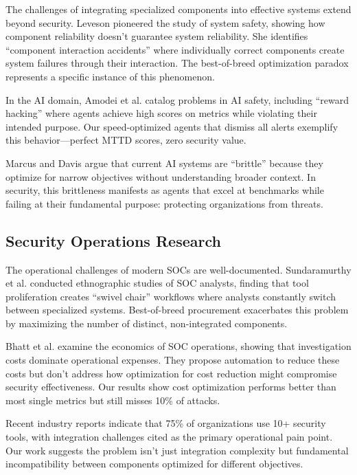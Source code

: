 \documentclass[10pt,conference]{IEEEtran}
\begin{document}
The challenges of integrating specialized components into effective systems extend beyond security. Leveson \cite{leveson2011engineering} pioneered the study of system safety, showing how component reliability doesn't guarantee system reliability. She identifies ``component interaction accidents'' where individually correct components create system failures through their interaction. The best-of-breed optimization paradox represents a specific instance of this phenomenon.

In the AI domain, Amodei et al. \cite{amodei2016concrete} catalog problems in AI safety, including ``reward hacking'' where agents achieve high scores on metrics while violating their intended purpose. Our speed-optimized agents that dismiss all alerts exemplify this behavior---perfect MTTD scores, zero security value.

Marcus and Davis \cite{marcus2019rebooting} argue that current AI systems are ``brittle'' because they optimize for narrow objectives without understanding broader context. In security, this brittleness manifests as agents that excel at benchmarks while failing at their fundamental purpose: protecting organizations from threats.

\subsection{Security Operations Research}

The operational challenges of modern SOCs are well-documented. Sundaramurthy et al. \cite{sundaramurthy2016anthropological} conducted ethnographic studies of SOC analysts, finding that tool proliferation creates ``swivel chair'' workflows where analysts constantly switch between specialized systems. Best-of-breed procurement exacerbates this problem by maximizing the number of distinct, non-integrated components.

Bhatt et al. \cite{bhatt2014economics} examine the economics of SOC operations, showing that investigation costs dominate operational expenses. They propose automation to reduce these costs but don't address how optimization for cost reduction might compromise security effectiveness. Our results show cost optimization performs better than most single metrics but still misses 10\% of attacks.

Recent industry reports \cite{ponemon2024soc} indicate that 75\% of organizations use 10+ security tools, with integration challenges cited as the primary operational pain point. Our work suggests the problem isn't just integration complexity but fundamental incompatibility between components optimized for different objectives.
\end{document}
